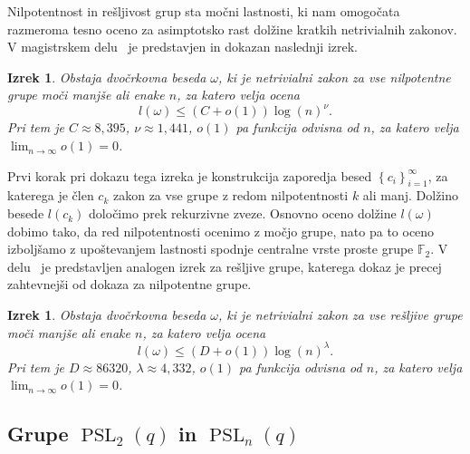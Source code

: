 \documentclass[12pt,a4paper]{article}
\newcounter{theoremcounter}[section] %
\newtheorem{izrek}[theoremcounter]{Izrek}
\newtheorem{definicija}[theoremcounter]{Definicija}
\begin{document}
Nilpotentnost in rešljivost grup sta močni lastnosti, ki nam omogočata razmeroma tesno oceno za asimptotsko rast dolžine kratkih netrivialnih zakonov. 
V magistrskem delu~\cite{Schneider_2016} je predstavjen in dokazan naslednji izrek.
\begin{izrek}
Obstaja dvočrkovna beseda $\omega$, ki je netrivialni zakon za vse nilpotentne grupe moči manjše ali enake $n$, za katero velja ocena \begin{equation*}
l(\omega) \le (C + o(1)) \log(n)^{\nu}. 
\end{equation*}  
Pri tem je $C \approx 8,395$, $\nu \approx 1,441$, $o(1)$ pa funkcija odvisna od $n$, za katero velja $\lim_{n \to \infty} o(1) = 0$. 
\end{izrek}
\noindent
Prvi korak pri dokazu tega izreka je konstrukcija zaporedja besed $\left\{ c_i \right\}_{i = 1}^{\infty}$, za katerega je člen $c_k$ zakon za
vse grupe z redom nilpotentnosti $k$ ali manj. Dolžino besede $l(c_k)$ določimo prek rekurzivne zveze. Osnovno oceno dolžine $l(\omega)$ dobimo tako, da red nilpotentnosti ocenimo z močjo grupe, nato pa to oceno izboljšamo z upoštevanjem lastnosti spodnje centralne
vrste proste grupe $\mathbb{F}_2$.
\noindent
V delu~\cite{Schneider_2016} je predstavljen analogen izrek za rešljive grupe, katerega dokaz je precej zahtevnejši od dokaza za nilpotentne grupe.
\begin{izrek}
    Obstaja dvočrkovna beseda $\omega$, ki je netrivialni zakon za vse rešljive grupe moči manjše ali enake $n$, za katero velja ocena \begin{equation*}
    l(\omega) \le (D + o(1)) {\log(n)}^{\lambda}. 
    \end{equation*}  
    Pri tem je $D \approx 86320$, $\lambda \approx 4,332$, $o(1)$ pa funkcija odvisna od $n$, za katero velja $\lim_{n \to \infty} o(1) = 0$. 
    \end{izrek}

\subsection{Grupe $\operatorname{PSL}_2(q)$ in $\operatorname{PSL}_n(q)$}
\end{document}
